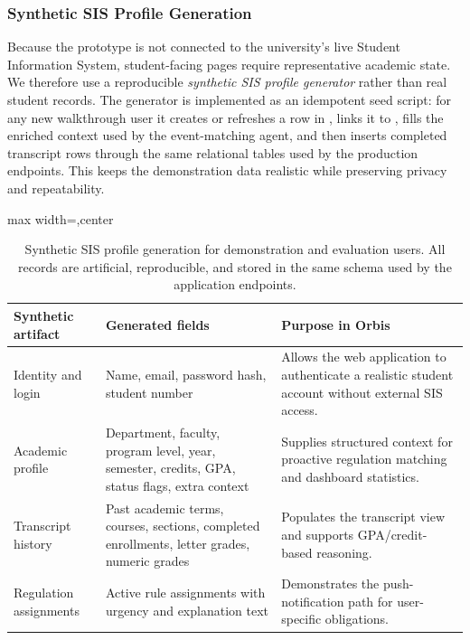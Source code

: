 \documentclass[a4paper,12pt]{article}
\renewcommand{\texttt}[1]{{\ttfamily\seqsplit{#1}}}
\begin{document}
\subsubsection{Synthetic SIS Profile Generation}
\label{sec:synthetic_profiles}
Because the prototype is not connected to the university's live Student Information System, student-facing pages require representative academic state. We therefore use a reproducible \emph{synthetic SIS profile generator} rather than real student records. The generator is implemented as an idempotent seed script: for any new walkthrough user it creates or refreshes a row in \texttt{users}, links it to \texttt{students}, fills the enriched \texttt{user\_profiles} context used by the event-matching agent, and then inserts completed transcript rows through the same relational tables used by the production endpoints. This keeps the demonstration data realistic while preserving privacy and repeatability.

\begin{table}[H]
\centering
\begin{adjustbox}{max width=\linewidth,center}
\begin{tabular}{p{4.0cm}p{5.0cm}p{5.2cm}}
\toprule
\textbf{Synthetic artifact} & \textbf{Generated fields} & \textbf{Purpose in Orbis} \\ \midrule
Identity and login & Name, email, password hash, student number & Allows the web application to authenticate a realistic student account without external SIS access. \\
Academic profile & Department, faculty, program level, year, semester, credits, GPA, status flags, extra context & Supplies structured context for proactive regulation matching and dashboard statistics. \\
Transcript history & Past academic terms, courses, sections, completed enrollments, letter grades, numeric grades & Populates the transcript view and supports GPA/credit-based reasoning. \\
Regulation assignments & Active rule assignments with urgency and explanation text & Demonstrates the push-notification path for user-specific obligations. \\
\bottomrule
\end{tabular}
\end{adjustbox}
\caption[Synthetic SIS Profile Generation]{Synthetic SIS profile generation for demonstration and evaluation users. All records are artificial, reproducible, and stored in the same schema used by the application endpoints.}
\label{tab:synthetic_profiles}
\end{table}
\end{document}
